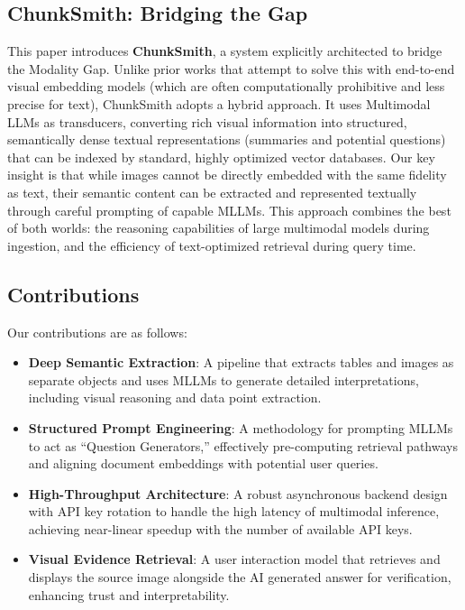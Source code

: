 \documentclass[conference]{IEEEtran}
\begin{document}
\subsection{ChunkSmith: Bridging the Gap}
This paper introduces \textbf{ChunkSmith}, a system explicitly architected to bridge the Modality Gap. Unlike prior works that attempt to solve this with end-to-end visual embedding models (which are often computationally prohibitive and less precise for text), ChunkSmith adopts a hybrid approach. It uses Multimodal LLMs as transducers, converting rich visual information into structured, semantically dense textual representations (summaries and potential questions) that can be indexed by standard, highly optimized vector databases. Our key insight is that while images cannot be directly embedded with the same fidelity as text, their semantic content can be extracted and represented textually through careful prompting of capable MLLMs. This approach combines the best of both worlds: the reasoning capabilities of large multimodal models during ingestion, and the efficiency of text-optimized retrieval during query time.

\subsection{Contributions}
Our contributions are as follows:
\begin{itemize}
    \item \textbf{Deep Semantic Extraction}: A pipeline that extracts tables and images as separate objects and uses MLLMs to generate detailed interpretations, including visual reasoning and data point extraction.
    \item \textbf{Structured Prompt Engineering}: A methodology for prompting MLLMs to act as ``Question Generators,'' effectively pre-computing retrieval pathways and aligning document embeddings with potential user queries.
    \item \textbf{High-Throughput Architecture}: A robust asynchronous backend design with API key rotation to handle the high latency of multimodal inference, achieving near-linear speedup with the number of available API keys.
    \item \textbf{Visual Evidence Retrieval}: A user interaction model that retrieves and displays the source image alongside the AI generated answer for verification, enhancing trust and interpretability.

\end{itemize}
\end{document}
